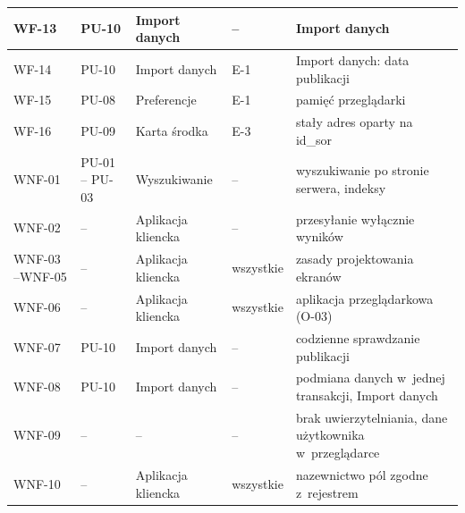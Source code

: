 \begin{longtable}{|p{1.7cm}|>{\raggedright\arraybackslash}p{2cm}|>{\raggedright\arraybackslash}p{3.3cm}|>{\raggedright\arraybackslash}p{1.6cm}|>{\raggedright\arraybackslash}p{5cm}|}
\hline
WF-13 & PU-10 & Import danych & -- & Import danych \\
\hline
WF-14 & PU-10 & Import danych & E-1 & Import danych: data publikacji \\
\hline
WF-15 & PU-08 & Preferencje & E-1 & pamięć przeglądarki \\
\hline
WF-16 & PU-09 & Karta środka & E-3 & stały adres oparty na id\_sor \\
\hline
WNF-01 & PU-01 -- PU-03 & Wyszukiwanie & -- & wyszukiwanie po stronie serwera, indeksy \\
\hline
WNF-02 & -- & Aplikacja kliencka & -- & przesyłanie wyłącznie wyników \\
\hline
WNF-03 --\newline WNF-05 &-- & Aplikacja kliencka & wszystkie & zasady projektowania ekranów \\
\hline
WNF-06 & -- & Aplikacja kliencka & wszystkie & aplikacja przeglądarkowa (O-03) \\
\hline
WNF-07 & PU-10 & Import danych & -- & codzienne sprawdzanie publikacji \\
\hline
WNF-08 & PU-10 & Import danych & -- & podmiana danych w~jednej transakcji, Import danych \\
\hline
WNF-09 & -- & -- & -- & brak uwierzytelniania, dane użytkownika w~przeglądarce \\
\hline
WNF-10 & -- & Aplikacja kliencka & wszystkie & nazewnictwo pól zgodne z~rejestrem \\
\hline
\end{longtable}
\endgroup
